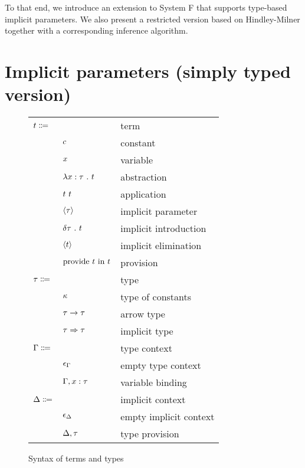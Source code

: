 \documentclass[acmlarge]{acmart}
\begin{document}
  To that end, we introduce an extension to System F that supports type-based implicit parameters. We also present a restricted version based on Hindley-Milner together with a corresponding inference algorithm.

\section{Implicit parameters (simply typed version)}

  \begin{figure}
    \begin{mdframed}

      \begin{tabular}{l l l}
        $t \Coloneqq $ & & term \\
        & $c$ & constant \\
        & $x$ & variable \\
        & $\lambda x : \tau \ . \ t$ & abstraction \\
        & $t \ t$ & application \\
        & $\left\langle \tau \right\rangle$ & implicit parameter \\
        & $\delta \tau \ . \ t$ & implicit introduction \\
        & $\left\langle t \right\rangle$ & implicit elimination \\
        & $\text{provide } t \text{ in } t$ & provision \\
        $\tau \Coloneqq$ & & type \\
        & $\kappa$ & type of constants \\
        & $\tau \rightarrow \tau$ & arrow type \\
        & $\tau \Rightarrow \tau$ & implicit type \\
        $\Gamma \Coloneqq$ & & type context \\
        & $\epsilon_{\Gamma}$ & empty type context \\
        & $\Gamma, x : \tau$ & variable binding \\
        $\Delta \Coloneqq$ & & implicit context \\
        & $\epsilon_{\Delta}$ & empty implicit context \\
        & $\Delta, \tau$ & type provision
      \end{tabular}

      \caption{Syntax of terms and types}
      \label{fig:syntax}

    \end{mdframed}
  \end{figure}
\end{document}
